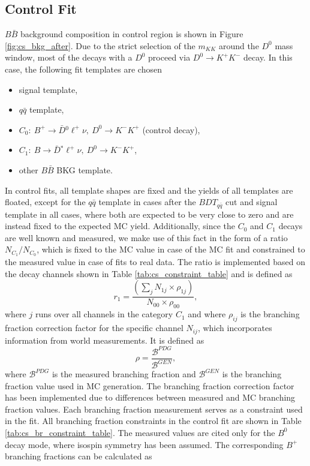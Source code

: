 \subsection{Control Fit}\label{sec:control-fit}
$B \bar B$ background composition in control region is shown in Figure \ref{fig:cs_bkg_after}. Due to the strict selection of the $m_{KK}$ around the $D^0$ mass window, most of the decays with a $D^0$ proceed via $D^0 \to K^+K^-$ decay. In this case, the following fit templates are chosen
\begin{itemize}
	\item signal template,
	\item $q \bar q$ template,
	\item $C_0:~B^+ \to \bar{D} {}^0 \ell^+ \nu,~D^0 \to K^-K^+$ (control decay),
	\item $C_1:~B \to \bar{D} {}^* \ell^+ \nu,~D^0 \to K^-K^+$,
	\item other $B \bar B$ BKG template.
\end{itemize}
In control fits, all template shapes are fixed and the yields of all templates are floated, except for the $q \bar q$ template in cases after the $BDT_{q \bar q}$ cut and signal template in all cases, where both are expected to be very close to zero and are instead fixed to the expected MC yield. Additionally, since the $C_0$ and $C_1$ decays are well known and measured, we make use of this fact in the form of a ratio $N_{C_1}/N_{C_0}$, which is fixed to the MC value in case of the MC fit and constrained to the measured value in case of fits to real data. The ratio is implemented based on the decay channels shown in Table \ref{tab:cs_constraint_table} and is defined as
\begin{equation}
r_1 = \frac{\left(\sum_j N_{1j}\times \rho_{1j} \right)}{N_{00} \times \rho_{00}},
\label{eq:cs_fix}
\end{equation}
where $j$ runs over all channels in the category $C_1$ and where $\rho_{ij}$ is the branching fraction correction factor for the specific channel $N_{ij}$, which incorporates information from world measurements. It is defined as 
\begin{equation}
\rho = \frac{\mathcal{B}^{PDG}}{\mathcal{B}^{GEN}},
\label{eq:br_fix}
\end{equation}
where $\mathcal{B}^{PDG}$ is the measured branching fraction and $\mathcal{B}^{GEN}$ is the branching fraction value used in MC generation. The branching fraction correction factor has been implemented due to differences between measured and MC branching fraction values. Each branching fraction measurement serves as a constraint used in the fit. All branching fraction constraints in the control fit are shown in Table \ref{tab:cs_br_constraint_table}. The measured values are cited only for the $B^0$ decay mode, where isospin symmetry has been assumed. The corresponding $B^+$ branching fractions can be calculated as
